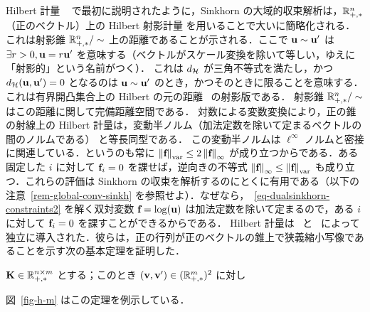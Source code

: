 \begin{rem1}{Hilbert 計量}
~\citep{franklin1989scaling} で最初に説明されたように，Sinkhorn の大域的収束解析は，$\mathbb{R}_{+,*}^n$（正のベクトル）上の Hilbert 射影計量
を用いることで大いに簡略化される．これは射影錐 $\mathbb{R}_{+,*}^n/\sim$ 上の距離であることが示される．ここで $\mathrm{\textbf{u}} \sim \mathrm{\textbf{u}}'$ は $\exists r>0, \mathrm{\textbf{u}}=r\mathrm{\textbf{u}}'$ を意味する（ベクトルがスケール変換を除いて等しい，ゆえに「射影的」という名前がつく）．
%
これは $d_{\mathcal{H}}$ が三角不等式を満たし，かつ $d_{\mathcal{H}}(\mathrm{\textbf{u}},\mathrm{\textbf{u}}')=0$ となるのは $\mathrm{\textbf{u}} \sim \mathrm{\textbf{u}}'$ のとき，かつそのときに限ることを意味する．
%
これは有界開凸集合上の Hilbert の元の距離~\citep{hilbert1895gerade} の射影版である．
%
射影錐 $\mathbb{R}_{+,*}^n/\sim$ はこの距離に関して完備距離空間である．
%
対数による変数変換により，正の錐の射線上の Hilbert 計量は，変動半ノルム（加法定数を除いて定まるベクトルの間のノルムである）
と等長同型である．
%
この変動半ノルムは $\ell^\infty$ ノルムと密接に関連している．というのも常に $\left\| \mathrm{\textbf{f}} \right\|_{\text{var}}  \leq 2 \left\| \mathrm{\textbf{f}} \right\|_\infty$ が成り立つからである．ある固定した $i$ に対して $\mathrm{\textbf{f}}_i=0$ を課せば，逆向きの不等式 $\left\| \mathrm{\textbf{f}} \right\|_\infty \leq \left\| \mathrm{\textbf{f}} \right\|_{\text{var}}$ も成り立つ．これらの評価は Sinkhorn の収束を解析するのにとくに有用である（以下の注意~\ref{rem-global-conv-sinkh} を参照せよ）．なぜなら，~\eqref{eq-dualsinkhorn-constraints2} を解く双対変数 $\mathrm{\textbf{f}}=\log(\mathrm{\textbf{u}})$ は加法定数を除いて定まるので，ある $i$ に対して $\mathrm{\textbf{f}}_i=0$ を課すことができるからである．
%
Hilbert 計量は~\citep{birkhoff1957extensions} と~\citep{samelson1957perron} によって独立に導入された．彼らは，正の行列が正のベクトルの錐上で狭義縮小写像であることを示す次の基本定理を証明した．


\begin{thm}\label{thm-birkoff}
	$\mathrm{\textbf{K}} \in \mathbb{R}_{+,*}^{n \times m}$ とする；このとき $(\mathrm{\textbf{v}},\mathrm{\textbf{v}}') \in (\mathbb{R}_{+,*}^m)^2$ に対し
\end{thm}

図~\ref{fig-h-m} はこの定理を例示している．
\end{rem1}


